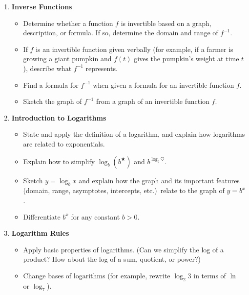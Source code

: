 \documentclass{article}
\begin{document}
\begin{enumerate}
  \addtocounter{enumi}{1}

\item \textbf{Inverse Functions} %
  \begin{itemize}

  \item Determine whether a function $f$ is invertible based on a graph,
    description, or formula. If so, determine the domain and range of $f^{-1}$. 

  \item If $f$ is an invertible function given verbally (for example, if a farmer is growing a giant pumpkin and $f(t)$ gives the pumpkin's weight at time $t$), describe what $f^{-1}$ represents. 

  \item Find a formula for $f^{-1}$ when given a formula for an invertible function $f$.

  \item Sketch the graph of $f^{-1}$ from a graph of an invertible function $f$.

  \end{itemize}

\item \textbf{Introduction to Logarithms} %
  \begin{itemize}
  \item State and apply the definition of a logarithm, and explain how logarithms are related to exponentials.

  \item Explain how to simplify $\log_b \left( b^{\bigstar} \right)$ and $b^{\log_b \heartsuit}$.

  \item Sketch $y = \log_b x$ and explain how the graph and its important features (domain, range, asymptotes, intercepts, etc.)\ relate to the graph of $y = b^x$.

  \item Differentiate $b^x$ for any constant $b > 0$.

  \end{itemize}
\addtocounter{enumi}{1}
\item \textbf{Logarithm Rules} %
  \begin{itemize}

  \item Apply basic properties of logarithms. (Can we simplify the log of a product? How about the log of a sum, quotient, or power?) 

  \item Change bases of logarithms (for example, rewrite $\log_2 3$ in terms of $\ln$ or $\log_7$). 


\end{itemize}
\end{enumerate}
\end{document}
